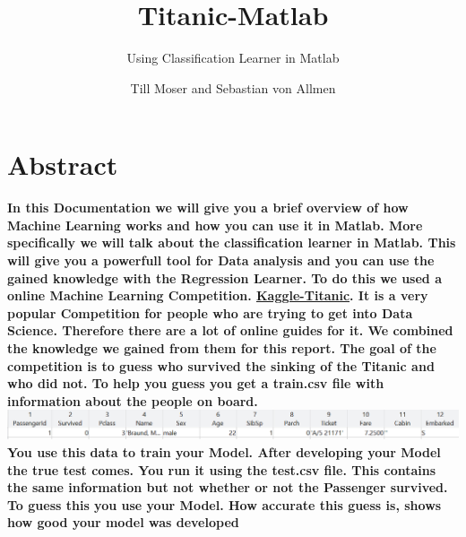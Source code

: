 \documentclass[
   10.5pt,
   invert-title=true,
   titlepage=false,
   titleimage-ratio=13,
   class=article
]{bfhpub}				%
\begin{document}
\setlength{\parskip}{0pt}
\setlength{\parindent}{0pt}
  \title{Titanic-Matlab}
  \subtitle{Using Classification Learner in Matlab}
  \author{Till Moser and Sebastian von Allmen}
  \subject{BZG1308ab}
  
  \maketitle

\section*{Abstract}
\textbf{In this Documentation we will give you a brief overview of how Machine Learning works and how you can use it in Matlab. More specifically we will talk about the classification learner in Matlab. This will give you a powerfull tool for Data analysis and you can use the gained knowledge with the Regression Learner.\newline
To do this we used a online Machine Learning Competition. \href{https://www.kaggle.com/c/titanic}{Kaggle-Titanic}. It is a very popular Competition for people who are trying to get into Data Science. Therefore there are a lot of online guides for it. We combined the knowledge we gained from them for this report. The goal of the competition is to guess who survived the sinking of the Titanic and who did not. To help you guess you get a train.csv file with information about the people on board. 
\includegraphics[width=155mm\\]{data} 
\newline
You use this data to train your Model. After developing your Model the true test comes. You run it using the test.csv file. This contains the same information but not whether or not the Passenger survived. To guess this you use your Model. How accurate this guess is, shows how good your model was developed}
\end{document}
